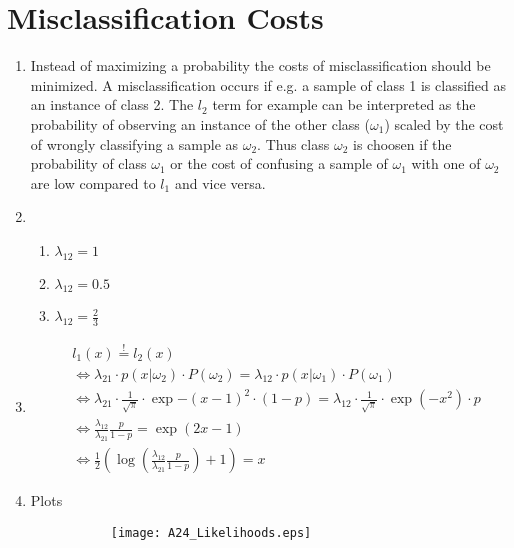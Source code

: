 \documentclass[DIN, pagenumber=false, fontsize=11pt, parskip=half]{scrartcl}
\begin{document}
    \section{Misclassification Costs}
    \begin{enumerate}
        \item
        Instead of maximizing a probability the costs of misclassification should be minimized. A misclassification occurs if e.g. a sample of class 1 is classified
        as an instance of class 2. The $l_2$ term for example can be interpreted as the probability of observing an instance of the other class ($\omega_1$) scaled by the cost of
        wrongly classifying a sample as $\omega_2$. Thus class $\omega_2$ is choosen if the probability of class $\omega_1$ or the cost of confusing a sample
        of $\omega_1$ with one of $\omega_2$ are low compared to $l_1$ and vice versa.
        \item
        \begin{enumerate}
            \item
            $\lambda_{12} = 1$
            \item
            $\lambda_{12} = 0.5$
            \item
            $\lambda_{12} = \frac{2}{3}$
        \end{enumerate}
        \item
        \begin{align*}
            &l_1(x) \stackrel{!}{=} l_2(x) \\
            &\Leftrightarrow \lambda_{21} \cdot p(x|\omega_2) \cdot P(\omega_2) = \lambda_{12} \cdot p(x|\omega_1) \cdot P(\omega_1) \\
            &\Leftrightarrow \lambda_{21} \cdot \frac{1}{\sqrt{\pi}} \cdot \exp{-(x-1)^2} \cdot (1-p) = \lambda_{12} \cdot \frac{1}{\sqrt{\pi}} \cdot \exp(-x^2) \cdot p \\
            &\Leftrightarrow \frac{\lambda_{12}}{\lambda_{21}} \frac{p}{1-p} = \exp(2x-1) \\
            &\Leftrightarrow \frac{1}{2} \left( \log\left( \frac{\lambda_{12}}{\lambda_{21}} \frac{p}{1-p} \right) + 1 \right) = x
        \end{align*}
        \item
        Plots
        \begin{figure}[H]
            \centering
            \begin{subfigure}[t]{0.49\textwidth}
                \centering
                \texttt{[image: A24\_Likelihoods.eps]}

\end{subfigure}
\end{figure}
\end{enumerate}
\end{document}
